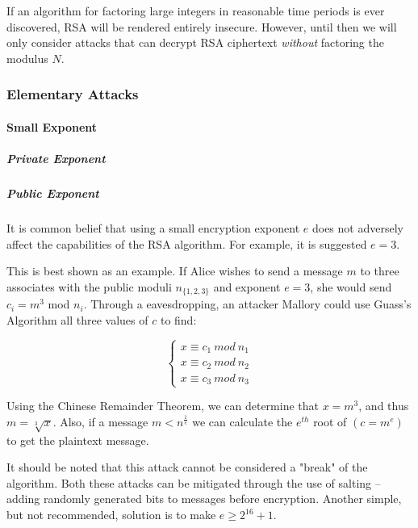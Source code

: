       If an algorithm for factoring large integers in reasonable time periods is ever discovered, RSA will be rendered entirely insecure. However, until then we will only consider attacks that can decrypt RSA ciphertext \emph{without} factoring the modulus $N$.
    
    \subsubsection{Elementary Attacks}
    
      \paragraph{Small Exponent}
  
        \subparagraph{Private Exponent}
        \subparagraph{Public Exponent}
        
          It is common belief that using a small encryption exponent $e$ does not adversely affect the capabilities of the RSA algorithm. For example, it is suggested $e=3$.
          
          This is best shown as an example. If Alice wishes to send a message $m$ to three associates with the public moduli $n_{\{1,2,3\}}$ and exponent $e=3$, she would send $c_i = m^3$ mod $n_i$. Through a eavesdropping, an attacker Mallory could use Guass's Algorithm all three values of $c$ to find:
          
          \[
          	\left\{
          	\begin{array}{ll}
                    x \equiv c_1 \  mod \  n_1 \\
                    x \equiv c_2 \  mod \  n_2\\
                    x \equiv c_3 \  mod \  n_3
                  \end{array}
                  \right.
          \]
          
          Using the Chinese Remainder Theorem, we can determine that $x = m^3$, and thus $m = \sqrt[3]{x}$. Also, if a message $m < n^{\frac{1}{e}}$ we can calculate the $e^{th}$ root of $(c=m^e)$ to get the plaintext message.
          
          It should be noted that this attack cannot be considered a "break" of the algorithm. Both these attacks can be mitigated through the use of salting -- adding randomly generated bits to messages before encryption. Another simple, but not recommended, solution is to make $e \geq 2^{16}+1$.
                    
